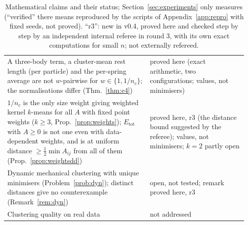 \documentclass[11pt,a4paper]{article}
\theoremstyle{plain}
\theoremstyle{definition}
\theoremstyle{remark}
\newcommand{\tot}{\mathrm{tot}}
\begin{document}
\begin{table}[t]
\begin{tabular}{>{\raggedright\arraybackslash}p{0.58\linewidth}>{\raggedright\arraybackslash}p{0.39\linewidth}}
A three-body term, a cluster-mean rest length (per particle) and the per-spring average are not $w$-pairwise for $w\in\{1,1/n_c\}$; the normalisations differ (Thm.~\ref{thm:e4}) & proved here (exact arithmetic, two configurations; values, not minimisers)\\
$1/n_c$ is the only size weight giving weighted kernel $k$-means for all $A$ with fixed point weights ($k\ge3$, Prop.~\ref{prop:weights}); $E_\tot$ with $A\ge0$ is not one even with data-dependent weights, and is at uniform distance $\ge\tfrac12\min A_{ij}$ from all of them (Prop.~\ref{prop:weightsdd}) & proved here, r3 (the distance bound suggested by the referee); values, not minimisers; $k=2$ partly open\\
Dynamic mechanical clustering with unique minimisers (Problem~\ref{prob:dyn}); distinct distances give no counterexample (Remark~\ref{rem:dyn}) & open, not tested; remark proved here, r3\\
Clustering quality on real data & not addressed\\
\bottomrule
\end{tabular}
\caption{Mathematical claims and their status; Section~\ref{sec:experiments} only measures (``verified'' there means reproduced by the scripts of Appendix~\ref{app:repro} with fixed seeds, not proved). ``r3'': new in v0.4, proved here and checked step by step by an independent internal referee in round 3, with its own exact computations for small $n$; not externally refereed.}
\label{tab:claims}
\end{table}
\end{document}
